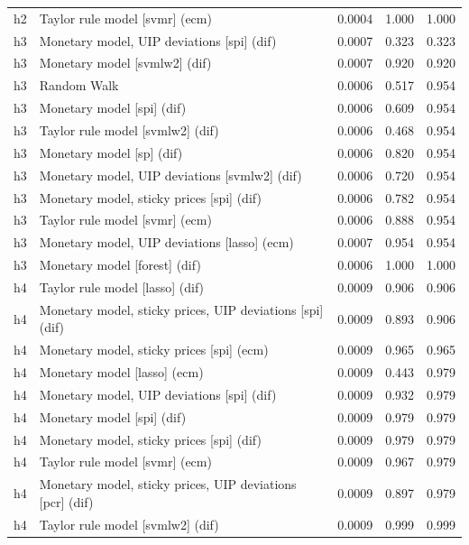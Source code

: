 \begin{ThreePartTable}
\begin{longtable}[t]{cp{5.5cm}ccc}
h2 & \raggedright Taylor rule model [svmr] (ecm) & 0.0004 & 1.000 & 1.000\\
\addlinespace
h3 & \raggedright Monetary model, UIP deviations [spi] (dif) & 0.0007 & 0.323 & 0.323\\
h3 & \raggedright Monetary model [svmlw2] (dif) & 0.0007 & 0.920 & 0.920\\
h3 & \raggedright Random Walk & 0.0006 & 0.517 & 0.954\\
h3 & \raggedright Monetary model [spi] (dif) & 0.0006 & 0.609 & 0.954\\
h3 & \raggedright Taylor rule model [svmlw2] (dif) & 0.0006 & 0.468 & 0.954\\
h3 & \raggedright Monetary model [sp] (dif) & 0.0006 & 0.820 & 0.954\\
h3 & \raggedright Monetary model, UIP deviations [svmlw2] (dif) & 0.0006 & 0.720 & 0.954\\
h3 & \raggedright Monetary model, sticky prices [spi] (dif) & 0.0006 & 0.782 & 0.954\\
h3 & \raggedright Taylor rule model [svmr] (ecm) & 0.0006 & 0.888 & 0.954\\
h3 & \raggedright Monetary model, UIP deviations [lasso] (ecm) & 0.0007 & 0.954 & 0.954\\
h3 & \raggedright Monetary model [forest] (dif) & 0.0006 & 1.000 & 1.000\\
\addlinespace
h4 & \raggedright Taylor rule model [lasso] (dif) & 0.0009 & 0.906 & 0.906\\
h4 & \raggedright Monetary model, sticky prices, UIP deviations [spi] (dif) & 0.0009 & 0.893 & 0.906\\
h4 & \raggedright Monetary model, sticky prices [spi] (ecm) & 0.0009 & 0.965 & 0.965\\
h4 & \raggedright Monetary model [lasso] (ecm) & 0.0009 & 0.443 & 0.979\\
h4 & \raggedright Monetary model, UIP deviations [spi] (dif) & 0.0009 & 0.932 & 0.979\\
h4 & \raggedright Monetary model [spi] (dif) & 0.0009 & 0.979 & 0.979\\
h4 & \raggedright Monetary model, sticky prices [spi] (dif) & 0.0009 & 0.979 & 0.979\\
h4 & \raggedright Taylor rule model [svmr] (ecm) & 0.0009 & 0.967 & 0.979\\
h4 & \raggedright Monetary model, sticky prices, UIP deviations [pcr] (dif) & 0.0009 & 0.897 & 0.979\\
h4 & \raggedright Taylor rule model [svmlw2] (dif) & 0.0009 & 0.999 & 0.999\\

\end{longtable}
\end{ThreePartTable}
